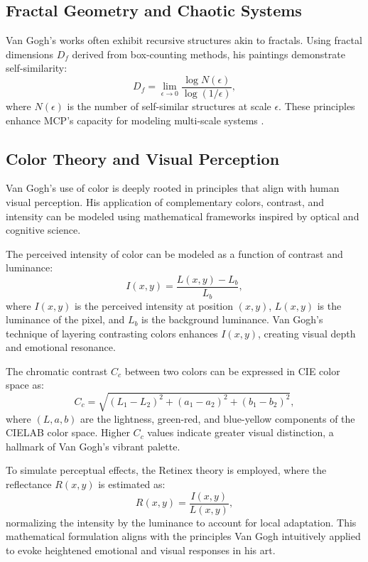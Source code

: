 \documentclass{article}
\theoremstyle{plain}
\begin{document}
\subsection{Fractal Geometry and Chaotic Systems}
Van Gogh's works often exhibit recursive structures akin to fractals. Using fractal dimensions $D_f$ derived from box-counting methods, his paintings demonstrate self-similarity:
\begin{equation}
D_f = \lim_{\epsilon \to 0} \frac{\log N(\epsilon)}{\log (1/\epsilon)},
\end{equation}
where $N(\epsilon)$ is the number of self-similar structures at scale $\epsilon$. These principles enhance MCP's capacity for modeling multi-scale systems \cite{Fractal2024}.

\subsection{Color Theory and Visual Perception}
Van Gogh's use of color is deeply rooted in principles that align with human visual perception. His application of complementary colors, contrast, and intensity can be modeled using mathematical frameworks inspired by optical and cognitive science.

The perceived intensity of color can be modeled as a function of contrast and luminance:
\begin{equation}
I(x, y) = \frac{L(x, y) - L_b}{L_b},
\end{equation}
where $I(x, y)$ is the perceived intensity at position $(x, y)$, $L(x, y)$ is the luminance of the pixel, and $L_b$ is the background luminance. Van Gogh's technique of layering contrasting colors enhances $I(x, y)$, creating visual depth and emotional resonance.

The chromatic contrast $C_c$ between two colors can be expressed in CIE color space as:
\begin{equation}
C_c = \sqrt{(L_1 - L_2)^2 + (a_1 - a_2)^2 + (b_1 - b_2)^2},
\end{equation}
where $(L, a, b)$ are the lightness, green-red, and blue-yellow components of the CIELAB color space. Higher $C_c$ values indicate greater visual distinction, a hallmark of Van Gogh's vibrant palette.

To simulate perceptual effects, the Retinex theory is employed, where the reflectance $R(x, y)$ is estimated as:
\begin{equation}
R(x, y) = \frac{I(x, y)}{L(x, y)},
\end{equation}
normalizing the intensity by the luminance to account for local adaptation. This mathematical formulation aligns with the principles Van Gogh intuitively applied to evoke heightened emotional and visual responses in his art.
\end{document}
